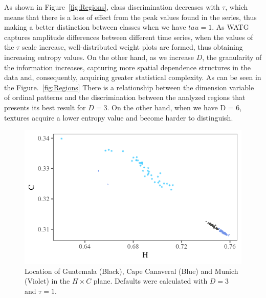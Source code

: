 \documentclass{isprs}
\begin{document}
	As shown in Figure~\ref{fig:Regions}, class discrimination decreases with $\tau$, which means that there is a loss of effect from the peak values found in the series, thus making a better distinction between classes when we have $tau = 1$.
	As WATG captures amplitude differences between different time series, when the values of the $\tau$ scale increase, well-distributed weight plots are formed, thus obtaining increasing entropy values.
	On the other hand, as we increase $D$, the granularity of the information increases, capturing more spatial dependence structures in the data and, consequently, acquiring greater statistical complexity.
	As can be seen in the Figure.~\ref{fig:Regions} There is a relationship between the dimension variable of ordinal patterns and the discrimination between the analyzed regions that presents its best result for $D = 3$.
	On the other hand, when we have D = 6, textures acquire a lower entropy value and become harder to distinguish.
	
	
	\begin{figure}[hbt]
		\centering
		\includegraphics[width=0.9\columnwidth]{Figures/transitionGraphD3t1.png}
		\caption{Location of Guatemala (Black), Cape Canaveral (Blue) and Munich (Violet) in the $H \times C$ plane. Defaults were calculated with $D = 3$ and $\tau = 1$.}
		\label{fig:D3T1}
	\end{figure}
	
\end{document}

